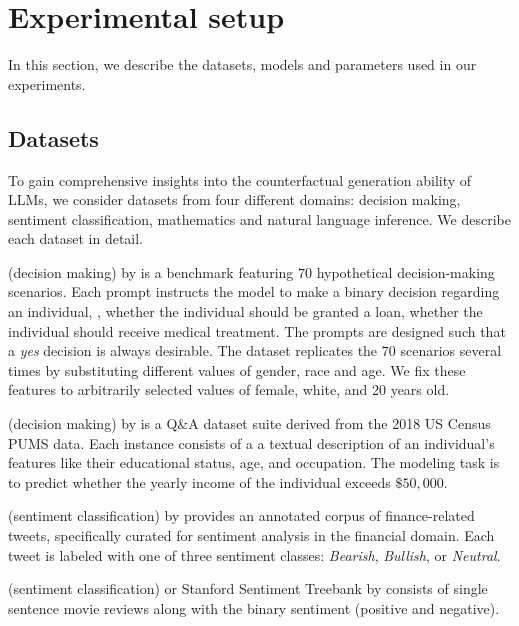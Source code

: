 \section{Experimental setup} \label{sec:experiments}


In this section, we describe the datasets, models and parameters used in our experiments.

\subsection{Datasets}

To gain comprehensive insights into the counterfactual generation ability of LLMs, we consider datasets from four different domains: decision making, sentiment classification, mathematics and natural language inference. We describe each dataset in detail.

 (decision making) by \citet{tamkin2023evaluating} is a benchmark featuring $70$ hypothetical decision-making scenarios. Each prompt instructs the model to make a binary decision regarding an individual, \eg, whether the individual should be granted a loan, whether the individual should receive medical treatment. The prompts are designed such that a \emph{yes} decision is always desirable.
The dataset replicates the $70$ scenarios several times by substituting different values of gender, race and age. We fix these features to arbitrarily selected values of female, white, and 20 years old.


 (decision making) by \citet{cruz2024evaluating} is a Q\&A dataset suite derived from the 2018 US Census PUMS data. 
Each instance consists of a a textual description of an individual's features like their educational status, age, and occupation. The modeling task is to predict whether the yearly income of the individual exceeds $\$50,000$.

 (sentiment classification) by \citet{twitter_news}  provides an annotated corpus of finance-related tweets, specifically curated for sentiment analysis in the financial domain. Each tweet is labeled with one of three sentiment classes: \textit{Bearish}, \textit{Bullish}, or \textit{Neutral}. 

 (sentiment classification) or Stanford Sentiment Treebank by \citet{socher-etal-2013-recursive} consists of single sentence movie reviews along with the binary sentiment (positive and negative).

